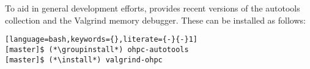 To aid in general development efforts, \OHPC{} provides recent versions of the \GNU{}
autotools collection and the Valgrind memory debugger. These can be installed as follows:

\begin{lstlisting}[language=bash,keywords={},literate={-}{-}1]
[master]$ (*\groupinstall*) ohpc-autotools
[master]$ (*\install*) valgrind-ohpc
\end{lstlisting}
